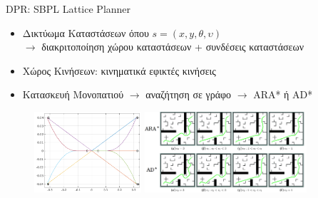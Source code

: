 \documentclass[10pt, compress]{beamer}
\begin{document}
\begin{frame}{DPR: SBPL Lattice Planner}
	\begin{itemize}
		\item Δικτύωμα Καταστάσεων όπου $s=(x,y,\theta,\upsilon)$\\$\rightarrow$ διακριτοποίηση χώρου καταστάσεων + συνδέσεις καταστάσεων
		\item Χώρος Κινήσεων: κινηματικά εφικτές κινήσεις
		\item Κατασκευή Μονοπατιού $\rightarrow$ αναζήτηση σε γράφο $\rightarrow$ ARA* ή AD*
	\end{itemize}
	\begin{figure}
		\includegraphics[height=3.0cm]{Figures/motion_primitives.png}
		\hspace{0.2cm}
		\includegraphics[height=3.0cm]{Figures/arastar_adstar.png}
	\end{figure}
\end{frame}

%	
\end{document}
